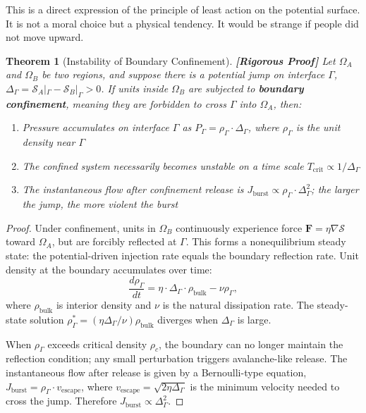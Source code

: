 \documentclass[12pt,a4paper]{article}
\newtheorem{theorem}{Theorem}[section]
\theoremstyle{remark}
\newcommand{\rigorFull}{\textnormal{\textbf{[Rigorous Proof]}}}
\begin{document}
This is a direct expression of the principle of least action on the potential surface. It is not a moral choice but a physical tendency. It would be strange if people did not move upward.

\begin{theorem}[Instability of Boundary Confinement]\label{thm:confinement}\rigorFull
Let $\Omega_A$ and $\Omega_B$ be two regions, and suppose there is a potential jump on interface $\Gamma$, $\Delta_\Gamma = \mathcal{S}_A|_\Gamma - \mathcal{S}_B|_\Gamma > 0$. If units inside $\Omega_B$ are subjected to \textbf{boundary confinement}, meaning they are forbidden to cross $\Gamma$ into $\Omega_A$, then:
\begin{enumerate}[label=(\roman*)]
    \item Pressure accumulates on interface $\Gamma$ as $P_\Gamma = \rho_\Gamma \cdot \Delta_\Gamma$, where $\rho_\Gamma$ is the unit density near $\Gamma$
    \item The confined system necessarily becomes unstable on a time scale $T_{\text{crit}} \propto 1/\Delta_\Gamma$
    \item The instantaneous flow after confinement release is $J_{\text{burst}} \propto \rho_\Gamma \cdot \Delta_\Gamma^2$; the larger the jump, the more violent the burst
\end{enumerate}
\end{theorem}

\begin{proof}
Under confinement, units in $\Omega_B$ continuously experience force $\mathbf{F} = \eta \nabla \mathcal{S}$ toward $\Omega_A$, but are forcibly reflected at $\Gamma$. This forms a nonequilibrium steady state: the potential-driven injection rate equals the boundary reflection rate. Unit density at the boundary accumulates over time:
\begin{equation}
    \frac{d\rho_\Gamma}{dt} = \eta \cdot \Delta_\Gamma \cdot \rho_{\text{bulk}} - \nu \rho_\Gamma,
\end{equation}
where $\rho_{\text{bulk}}$ is interior density and $\nu$ is the natural dissipation rate. The steady-state solution $\rho_\Gamma^* = (\eta \Delta_\Gamma / \nu) \rho_{\text{bulk}}$ diverges when $\Delta_\Gamma$ is large.

When $\rho_\Gamma$ exceeds critical density $\rho_c$, the boundary can no longer maintain the reflection condition; any small perturbation triggers avalanche-like release. The instantaneous flow after release is given by a Bernoulli-type equation, $J_{\text{burst}} = \rho_\Gamma \cdot v_{\text{escape}}$, where $v_{\text{escape}} = \sqrt{2\eta \Delta_\Gamma}$ is the minimum velocity needed to cross the jump. Therefore $J_{\text{burst}} \propto \Delta_\Gamma^2$.
\end{proof}
\end{document}

